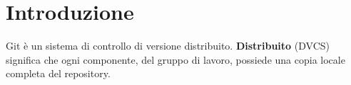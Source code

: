 %

\global\let\tikz@ensure@dollar@catcode=\relax %


\section{Introduzione} %
\label{sec:introduzione}
Git è un sistema di controllo di versione distribuito.
\newline
\textbf{Distribuito} (DVCS) significa che ogni componente, del gruppo di lavoro, possiede una copia locale completa del repository.
\newline

